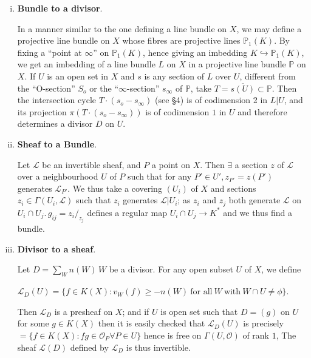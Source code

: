 {\begin{enumerate}[(i)]
We\pageoriginale remark that in (i) if we had started with a $D' \sim D$ oven then
we would have arrived at the same line bundle; and in (iii) if we
had choosen a different imbedding $\mathscr{L} \subset \mathscr{K}$
then we would have arrived at an equivalent divisor. Thus, what we have
shown is that giving an element of Pic $X$ is equivalent to giving a
line bundle or an invertible sheaf.  

\item{\bf Bundle to a divisor}.

In a manner similar to the one defining a line bundle on $X$, we may
define a projective line bundle on $X$ whose fibres are projective
lines $\mathbb{P}_{1}(K)$. By fixing a ``point at $\infty$'' on
$\mathbb{P}_{1}(K)$, hence giving an imbedding $K \hookrightarrow
\mathbb{P}_{1}(K)$, we get an imbedding of a line bundle $L$ on $X$ in
a projective line bundle $\mathbb{P}$ on $X$. If $U$ is an open set in
$X$ and  $s$ is any section of $L$ over $U$, different from the 
``O-section'' $S_o$ or the ``$\infty$-section'' $s_{\infty}$ of $\mathbb{P}$,
take $T = \overline{s (U)} \subset \mathbb{P}$. Then the intersection
cycle $T\cdot (s_o - s_{\infty})$ (see \S 4) is of codimension 2 in $L|U$, and
its projection $\pi (T\cdot (s_{o} - s_{\infty}))$ is of codimension $1$ in
$U$ and therefore determines a divisor $D$ on $U$.    
 
\item {\bf Sheaf to a Bundle}.

Let $\mathscr{L}$ be an invertible sheaf, and $P$ a point on $X$. Then
$\exists$ a section $z$ of $\mathscr{L}$ over a neighbourhood $U$ of
$P$ such that for any $P' \in U', z_{P'} = z(P')$ generates
$\mathscr{L}_{P'}$. We thus take a covering $(U_{i})$ of $X$ and
sections $z_{i} \in \Gamma (U_{i}, \mathscr{L})$ such that $z_{i}$
generates $\mathscr{L}\big|{U_{i}}$; as $z_{i}$ and $z_{j}$ both
generate $\mathscr{L}$ on $U_{i} \cap U_{j}. \, g_{ij} =
z_{i}/_{z_{j}}$ defines a regular map $U_{i} \cap U_{j} \to K^{*}$ and
we thus find a bundle.  

\item{\bf Divisor to a sheaf}.\pageoriginale

Let $D = \sum\limits_{W} n (W) \,W$ be a divisor. For any open subset
$U$ of $X$, we define  

$\mathscr{L}_{D}(U) = \big\{f \in K (X) : v_{W}(f) \ge -n (W)
~\text{for all}~ W ~\text{with}~ W \cap U \neq \phi\big\}$. 

Then $\mathscr{L}_{D}$ is a presheaf on $X$; and if $U$ is open set
such that $D = (g)$ on $U$ for some $g \in K(X)$ then it is easily
checked that $\mathscr{L}_{D}(U)$ is precisely $ = \big\{ f \in K(X) :
f g \in \mathscr{O}_{P} \forall P \in U\big\}$ hence is free on
$\Gamma (U, \mathscr{O})$ of rank $1$, The sheaf $\mathscr{L}(D)$
defined by $\mathscr{L}_{D}$ is thus invertible.  


\end{enumerate}}
